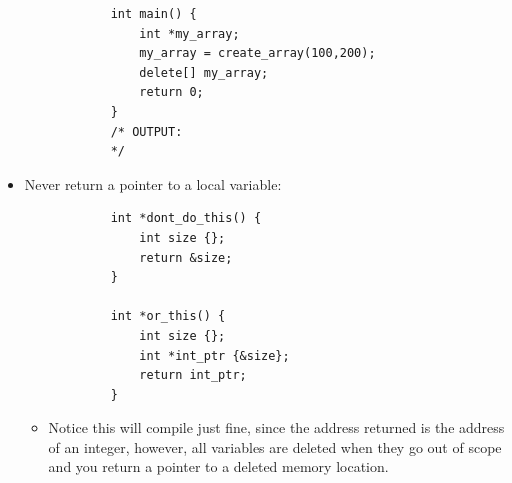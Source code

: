 \begin{itemize}
\begin{verbatim}
            int main() {
                int *my_array;
                my_array = create_array(100,200);
                delete[] my_array;
                return 0;
            }
            /* OUTPUT:
            */
        \end{verbatim}
    
    \item Never return a pointer to a local variable:
        \begin{verbatim}
            int *dont_do_this() {
                int size {};
                return &size;
            }

            int *or_this() {
                int size {};
                int *int_ptr {&size};
                return int_ptr;
            }
        \end{verbatim}
        \begin{itemize}
            \item Notice this will compile just fine, since the address returned is the address of an integer, however, all variables are deleted when they go out of scope and you return a pointer to a deleted memory location.
        \end{itemize}
\end{itemize}


